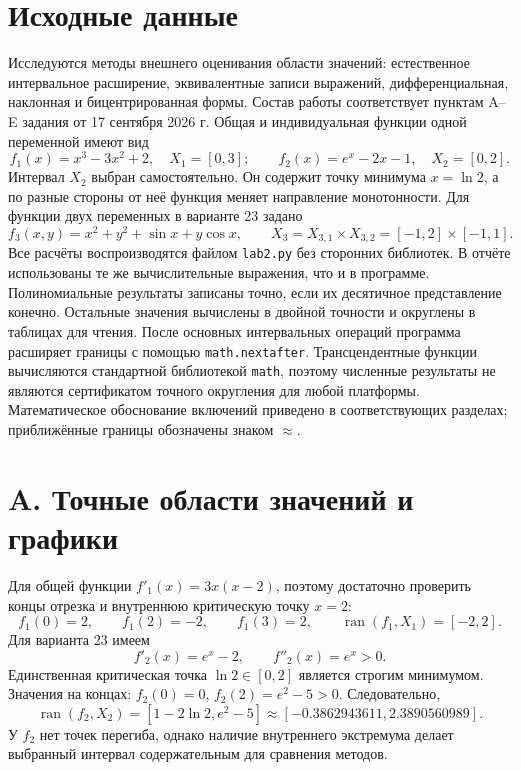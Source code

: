\documentclass[12pt,a4paper]{article}
\newcommand{\ran}{\operatorname{ran}}
\begin{document}
\section*{Исходные данные}
Исследуются методы внешнего оценивания области значений: естественное
интервальное расширение, эквивалентные записи выражений, дифференциальная,
наклонная и бицентрированная формы. Состав работы соответствует пунктам
A--E задания от 17 сентября 2026 г.
Общая и индивидуальная функции одной переменной имеют вид
\begin{equation}\label{eq:input}
f_1(x)=x^3-3x^2+2,\quad X_1=[0,3];\qquad
f_2(x)=e^x-2x-1,\quad X_2=[0,2].
\end{equation}
Интервал $X_2$ выбран самостоятельно. Он содержит точку минимума
$x=\ln2$, а по разные стороны от неё функция меняет направление
монотонности. Для функции двух переменных в варианте 23 задано
\begin{equation}\label{eq:f3}
f_3(x,y)=x^2+y^2+\sin x+y\cos x,\qquad
X_3=X_{3,1}\times X_{3,2}=[-1,2]\times[-1,1].
\end{equation}
Все расчёты воспроизводятся файлом \texttt{lab2.py} без сторонних
библиотек. В отчёте использованы те же вычислительные выражения,
что и в программе. Полиномиальные результаты записаны точно,
если их десятичное представление конечно. Остальные значения
вычислены в двойной точности и округлены в таблицах для чтения.
После основных интервальных операций программа расширяет границы
с помощью \texttt{math.nextafter}. Трансцендентные функции вычисляются
стандартной библиотекой \texttt{math}, поэтому численные результаты
не являются сертификатом точного округления для любой платформы.
Математическое обоснование включений приведено в соответствующих
разделах; приближённые границы обозначены знаком $\approx$.

\section*{A. Точные области значений и графики}
Для общей функции $f'_1(x)=3x(x-2)$, поэтому достаточно проверить
концы отрезка и внутреннюю критическую точку $x=2$:
\[
f_1(0)=2,\qquad f_1(2)=-2,\qquad f_1(3)=2,
\qquad\boxed{\ran(f_1,X_1)=[-2,2]}.
\]
Для варианта 23 имеем
\[
f'_2(x)=e^x-2,\qquad f''_2(x)=e^x>0.
\]
Единственная критическая точка $\ln2\in[0,2]$ является строгим
минимумом. Значения на концах: $f_2(0)=0$, $f_2(2)=e^2-5>0$.
Следовательно,
\begin{equation}\label{eq:range2}
\boxed{\ran(f_2,X_2)=[1-2\ln2,e^2-5]
\approx[-0.3862943611,2.3890560989]}.
\end{equation}
У $f_2$ нет точек перегиба, однако наличие внутреннего экстремума
делает выбранный интервал содержательным для сравнения методов.
\end{document}
